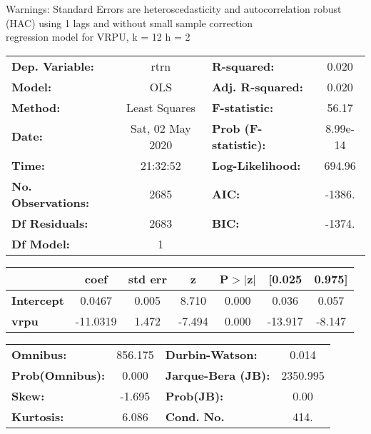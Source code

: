 Warnings: \newline
 [1] Standard Errors are heteroscedasticity and autocorrelation robust (HAC) using 1 lags and without small sample correction\\ 

regression model for VRPU, k = 12 h = 2\begin{center}
\begin{tabular}{lclc}
\toprule
\textbf{Dep. Variable:}    &       rtrn       & \textbf{  R-squared:         } &     0.020   \\
\textbf{Model:}            &       OLS        & \textbf{  Adj. R-squared:    } &     0.020   \\
\textbf{Method:}           &  Least Squares   & \textbf{  F-statistic:       } &     56.17   \\
\textbf{Date:}             & Sat, 02 May 2020 & \textbf{  Prob (F-statistic):} &  8.99e-14   \\
\textbf{Time:}             &     21:32:52     & \textbf{  Log-Likelihood:    } &    694.96   \\
\textbf{No. Observations:} &        2685      & \textbf{  AIC:               } &    -1386.   \\
\textbf{Df Residuals:}     &        2683      & \textbf{  BIC:               } &    -1374.   \\
\textbf{Df Model:}         &           1      & \textbf{                     } &             \\
\bottomrule
\end{tabular}
\begin{tabular}{lcccccc}
                   & \textbf{coef} & \textbf{std err} & \textbf{z} & \textbf{P$> |$z$|$} & \textbf{[0.025} & \textbf{0.975]}  \\
\midrule
\textbf{Intercept} &       0.0467  &        0.005     &     8.710  &         0.000        &        0.036    &        0.057     \\
\textbf{vrpu}      &     -11.0319  &        1.472     &    -7.494  &         0.000        &      -13.917    &       -8.147     \\
\bottomrule
\end{tabular}
\begin{tabular}{lclc}
\textbf{Omnibus:}       & 856.175 & \textbf{  Durbin-Watson:     } &    0.014  \\
\textbf{Prob(Omnibus):} &   0.000 & \textbf{  Jarque-Bera (JB):  } & 2350.995  \\
\textbf{Skew:}          &  -1.695 & \textbf{  Prob(JB):          } &     0.00  \\
\textbf{Kurtosis:}      &   6.086 & \textbf{  Cond. No.          } &     414.  \\
\bottomrule
\end{tabular}
\end{center}

